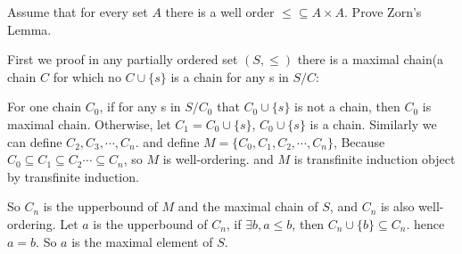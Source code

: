 \documentclass{ximera}
\begin{document}
\begin{problem}
    Assume that for every set $A$ there is a well order $\leqslant \subseteq A \times A$. 
    Prove Zorn’s Lemma.
    \begin{solution}


        
        First we proof in any partially ordered set $(S, \leqslant)$
        there is a maximal chain(a chain $C$ for which no $C \cup \{s\}$ is a chain for any s in $S / C$:
        
        For one chain $C_0$, if for any s in $S / C_0$ that $C_0 \cup \{s\}$ is not a chain, then $C_0$ is 
        maximal chain. Otherwise, let $C_1 = C_0 \cup \{s\}$, $C_0 \cup \{s\}$ is a chain. Similarly we can define 
        $C_2, C_3, \cdots, C_n$. and define $M = \{ C_0, C_1, C_2, \cdots, C_n \}$, 
        Because $C_0 \subseteq C_1 \subseteq C_2 \cdots \subseteq C_n$, so $M$ is well-ordering.
        and $M$ is transfinite induction object by transfinite induction.
        
        So $C_n$ is the upperbound of $M$ and the maximal chain of $S$, and $C_n$ is also well-ordering.
        Let $a$ is the upperbound of $C_n$, if $\exists b, a \leq b$, then $C_n \cup \{ b \} \subseteq C_n$.
        hence $a = b$. So $a$ is the maximal element of $S$.
    \end{solution}
\end{problem}
\end{document}
